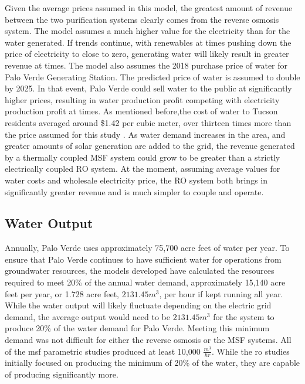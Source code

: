 	Given the average prices assumed in this model, the greatest amount of revenue between the two purification systems clearly comes from the reverse osmosis system.  The model assumes a much higher value for the electricity than for the water generated.  If trends continue, with renewables at times pushing down the price of electricity to close to zero, generating water will likely result in greater revenue at times.  The model also assumes the 2018 purchase price of water for Palo Verde Generating Station. The predicted price of water is assumed to double by 2025\cite{Brown2018}.  In that event, Palo Verde could sell water to the public at significantly higher prices, resulting in water production profit competing with electricity production profit at times.  As mentioned before,the cost of water to Tucson residents averaged around \$1.42 per cubic meter, over thirteen times more than the price assumed for this study \cite{CityofTucson2017}.  As water demand increases in the area, and greater amounts of solar generation are added to the grid, the revenue generated by a thermally coupled MSF system could grow to be greater than a strictly electrically coupled RO system. At the moment, assuming average values for water costs and wholesale electricity price, the RO system both brings in significantly greater revenue and is much simpler to couple and operate.
    

\subsection{Water Output}
Annually, Palo Verde uses approximately 75,700 acre feet of water per year.  To ensure that Palo Verde continues to have sufficient water for operations from groundwater resources, the models developed have calculated the resources required to meet 20\% of the annual water demand, approximately 15,140 acre feet per year, or 1.728 acre feet, $2131.45 m^3$, per hour if kept running all year. While the water output will likely fluctuate depending on the electric grid demand, the average output would need to be $2131.45 m^3$ for the system to produce 20\% of the water demand for Palo Verde. Meeting this minimum demand was not difficult for either the reverse osmosis or the MSF systems. All of the \ac{msf} parametric studies produced at least 10,000 $\frac{m^3}{hr}$.  While the \ac{ro} studies initially focused on producing the minimum of 20\% of the water, they are capable of producing significantly more.
% 
% 

